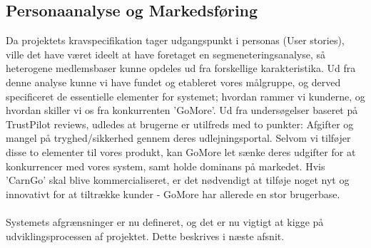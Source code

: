 \documentclass[Rapport/Rapport_main.tex]{subfiles}
\begin{document}
\subsection{Personaanalyse og Markedsføring}
Da projektets kravspecifikation tager udgangspunkt i personas (User stories), ville det have været ideelt at have foretaget en segmeneteringsanalyse, så heterogene medlemsbaser kunne opdeles ud fra forskellige karakteristika. Ud fra denne analyse kunne vi have fundet og etableret vores målgruppe, og derved specificeret de essentielle elementer for systemet; hvordan rammer vi kunderne, og hvordan skiller vi os fra konkurrenten 'GoMore'. Ud fra undersøgelser baseret på TrustPilot reviews, udledes at brugerne er utilfreds med to punkter: Afgifter og mangel på tryghed/sikkerhed gennem deres udlejningsportal. Selvom vi tilføjer disse to elementer til vores produkt, kan GoMore let sænke deres udgifter for at konkurrencer med vores system, samt holde dominans på markedet. Hvis 'CarnGo' skal blive kommercialiseret, er det nødvendigt at tilføje noget nyt og innovativt for at tiltrække kunder - GoMore har allerede en stor brugerbase. \\\\
Systemets afgrænsninger er nu defineret, og det er nu vigtigt at kigge på udviklingsprocessen af projektet. Dette beskrives i næste afsnit. 
\end{document}
